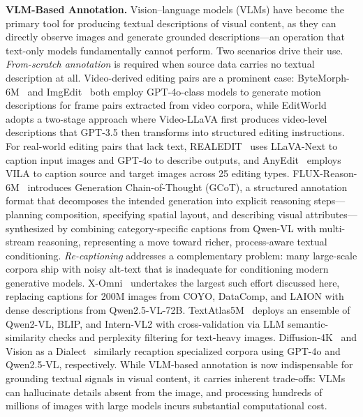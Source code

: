 \documentclass{llmxive}
\begin{document}
\textbf{VLM-Based Annotation.}
Vision--language models (VLMs) have become the primary tool for producing textual descriptions of visual content, as they can directly observe images and generate grounded descriptions---an operation that text-only models fundamentally cannot perform. Two scenarios drive their use. \emph{From-scratch annotation} is required when source data carries no textual description at all. Video-derived editing pairs are a prominent case: ByteMorph-6M~\citep{chang2025bytemorph} and ImgEdit~\citep{ye2025imgedit} both employ GPT-4o-class models to generate motion descriptions for frame pairs extracted from video corpora, while EditWorld~\citep{zeng2025editworld} adopts a two-stage approach where Video-LLaVA first produces video-level descriptions that GPT-3.5 then transforms into structured editing instructions. For real-world editing pairs that lack text, REALEDIT~\citep{sushko2025realedit} uses LLaVA-Next to caption input images and GPT-4o to describe outputs, and AnyEdit~\citep{yu2025anyedit} employs VILA to caption source and target images across 25 editing types. FLUX-Reason-6M~\citep{fang2025flux} introduces Generation Chain-of-Thought (GCoT), a structured annotation format that decomposes the intended generation into explicit reasoning steps---planning composition, specifying spatial layout, and describing visual attributes---synthesized by combining category-specific captions from Qwen-VL with multi-stream reasoning, representing a move toward richer, process-aware textual conditioning. \emph{Re-captioning} addresses a complementary problem: many large-scale corpora ship with noisy alt-text that is inadequate for conditioning modern generative models. X-Omni~\citep{geng2025x} undertakes the largest such effort discussed here, replacing captions for 200M images from COYO, DataComp, and LAION with dense descriptions from Qwen2.5-VL-72B. TextAtlas5M~\citep{wang2025textatlas5m} deploys an ensemble of Qwen2-VL, BLIP, and Intern-VL2 with cross-validation via LLM semantic-similarity checks and perplexity filtering for text-heavy images. Diffusion-4K~\citep{zhang2025diffusion} and Vision as a Dialect~\citep{han2025vision} similarly recaption specialized corpora using GPT-4o and Qwen2.5-VL, respectively. While VLM-based annotation is now indispensable for grounding textual signals in visual content, it carries inherent trade-offs: VLMs can hallucinate details absent from the image, and processing hundreds of millions of images with large models incurs substantial computational cost.
\end{document}
